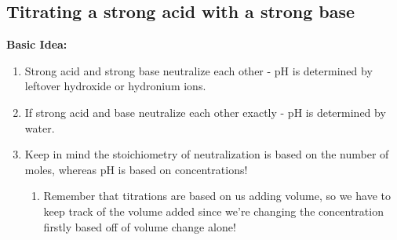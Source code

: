 \documentclass[../CHEM152Notes.tex]{subfiles}
\begin{document}
\subsection*{Titrating a strong acid with a strong base}
\textbf{Basic Idea:}
\begin{enumerate}
    \item Strong acid and strong base neutralize each other - pH is determined by leftover hydroxide or hydronium ions.
    \item If strong acid and base neutralize each other exactly - pH is determined by water.
    \item Keep in mind the stoichiometry of neutralization is based on the number of moles, whereas pH is based on concentrations!
    \begin{enumerate}
        \item Remember that titrations are based on us adding volume, so we have to keep track of the volume added since we're changing the concentration firstly based off of volume change alone!
    \end{enumerate}
\end{enumerate}
\end{document}
